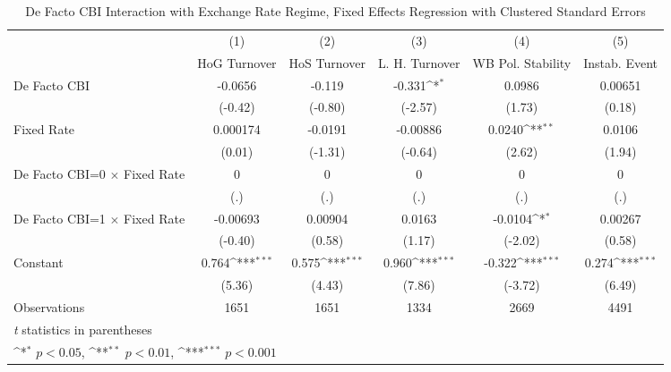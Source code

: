 \begin{table}[htbp]\centering
\def\sym#1{\ifmmode^{#1}\else\(^{#1}\)\fi}
\caption{De Facto CBI Interaction with Exchange Rate Regime, Fixed Effects Regression with Clustered Standard Errors \label{imultIndFEDF}}
\begin{tabular}{l*{5}{c}}
\toprule
                                        &\multicolumn{1}{c}{(1)}&\multicolumn{1}{c}{(2)}&\multicolumn{1}{c}{(3)}&\multicolumn{1}{c}{(4)}&\multicolumn{1}{c}{(5)}\\
                                        &\multicolumn{1}{c}{HoG Turnover}&\multicolumn{1}{c}{HoS Turnover}&\multicolumn{1}{c}{L. H. Turnover}&\multicolumn{1}{c}{WB Pol. Stability}&\multicolumn{1}{c}{Instab. Event}\\
\midrule
De Facto CBI                            &  -0.0656         &   -0.119         &   -0.331\sym{*}  &   0.0986         &  0.00651         \\
                                        &  (-0.42)         &  (-0.80)         &  (-2.57)         &   (1.73)         &   (0.18)         \\
\addlinespace
Fixed Rate                              & 0.000174         &  -0.0191         & -0.00886         &   0.0240\sym{**} &   0.0106         \\
                                        &   (0.01)         &  (-1.31)         &  (-0.64)         &   (2.62)         &   (1.94)         \\
\addlinespace
De Facto CBI=0 $\times$ Fixed Rate      &        0         &        0         &        0         &        0         &        0         \\
                                        &      (.)         &      (.)         &      (.)         &      (.)         &      (.)         \\
\addlinespace
De Facto CBI=1 $\times$ Fixed Rate      & -0.00693         &  0.00904         &   0.0163         &  -0.0104\sym{*}  &  0.00267         \\
                                        &  (-0.40)         &   (0.58)         &   (1.17)         &  (-2.02)         &   (0.58)         \\
\addlinespace
Constant                                &    0.764\sym{***}&    0.575\sym{***}&    0.960\sym{***}&   -0.322\sym{***}&    0.274\sym{***}\\
                                        &   (5.36)         &   (4.43)         &   (7.86)         &  (-3.72)         &   (6.49)         \\
\midrule
Observations                            &     1651         &     1651         &     1334         &     2669         &     4491         \\
\bottomrule
\multicolumn{6}{l}{\footnotesize \textit{t} statistics in parentheses}\\
\multicolumn{6}{l}{\footnotesize \sym{*} \(p<0.05\), \sym{**} \(p<0.01\), \sym{***} \(p<0.001\)}\\
\end{tabular}
\end{table}

